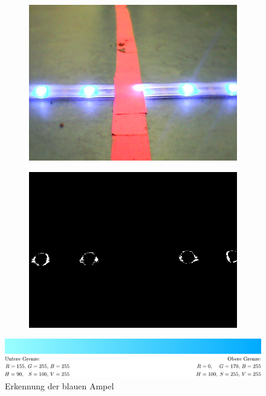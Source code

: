 \documentclass[a4paper, 12pt]{scrartcl}
\begin{document}
\begin{figure}[H]
	\centering
	\begin{subfigure}{.5\textwidth}
		\centering
		\includegraphics[width=\textwidth]{../testbilder/blau.png}
	\end{subfigure}%
	\begin{subfigure}{.5\textwidth}
		\centering
		\includegraphics[width=\textwidth]{../testbilder/blau2.png}
	\end{subfigure}
	\vspace{1ex}

	\includegraphics[width=1\textwidth]{../testbilder/Blau_Bereich.pdf}
	\caption{Erkennung der blauen Ampel}
\end{figure}
\end{document}

